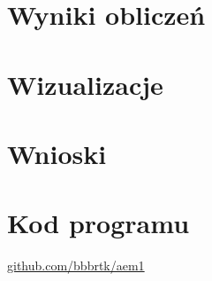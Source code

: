 \documentclass{article}
\begin{document}
\section{Wyniki obliczeń}


\section{Wizualizacje}


\section{Wnioski}

\section{Kod programu}
\href{https://github.com/bbbrtk/aem}{github.com/bbbrtk/aem1}
\end{document}
